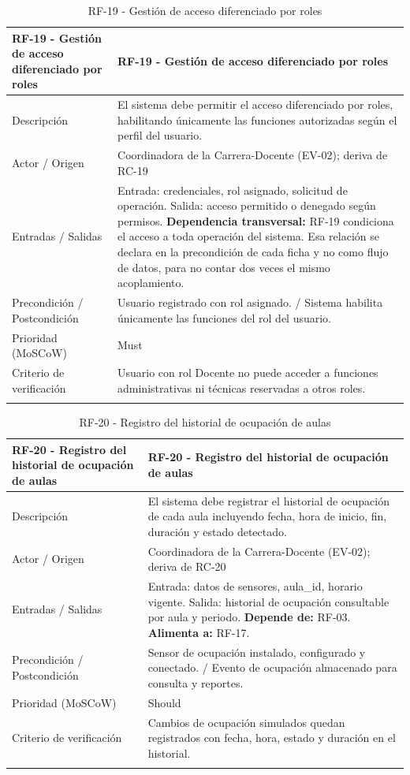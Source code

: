 \begingroup
\small
\begin{longtable}{|P{0.5000}|P{0.5000}|}
\hline
RF-19 - Gestión de acceso diferenciado por roles & RF-19 - Gestión de acceso diferenciado por roles \\ \hline
Descripción & El sistema debe permitir el acceso diferenciado por roles, habilitando únicamente las funciones autorizadas según el perfil del usuario. \\ \hline
Actor / Origen & Coordinadora de la Carrera-Docente (EV-02); deriva de RC-19 \\ \hline
Entradas / Salidas & Entrada: credenciales, rol asignado, solicitud de operación. Salida: acceso permitido o denegado según permisos. \textbf{Dependencia transversal:} RF-19 condiciona el acceso a toda operaci\'on del sistema. Esa relaci\'on se declara en la precondici\'on de cada ficha y no como flujo de datos, para no contar dos veces el mismo acoplamiento. \\ \hline
Precondición / Postcondición & Usuario registrado con rol asignado. / Sistema habilita únicamente las funciones del rol del usuario. \\ \hline
Prioridad (MoSCoW) & Must \\ \hline
Criterio de verificación & Usuario con rol Docente no puede acceder a funciones administrativas ni técnicas reservadas a otros roles. \\ \hline
\caption{RF-19 - Gestión de acceso diferenciado por roles}
\end{longtable}
\endgroup

\begingroup
\small
\begin{longtable}{|P{0.5000}|P{0.5000}|}
\hline
RF-20 - Registro del historial de ocupación de aulas & RF-20 - Registro del historial de ocupación de aulas \\ \hline
Descripción & El sistema debe registrar el historial de ocupación de cada aula incluyendo fecha, hora de inicio, fin, duración y estado detectado. \\ \hline
Actor / Origen & Coordinadora de la Carrera-Docente (EV-02); deriva de RC-20 \\ \hline
Entradas / Salidas & Entrada: datos de sensores, aula\_id, horario vigente. Salida: historial de ocupación consultable por aula y periodo. \textbf{Depende de:} RF-03. \textbf{Alimenta a:} RF-17. \\ \hline
Precondición / Postcondición & Sensor de ocupación instalado, configurado y conectado. / Evento de ocupación almacenado para consulta y reportes. \\ \hline
Prioridad (MoSCoW) & Should \\ \hline
Criterio de verificación & Cambios de ocupación simulados quedan registrados con fecha, hora, estado y duración en el historial. \\ \hline
\caption{RF-20 - Registro del historial de ocupación de aulas}
\end{longtable}
\endgroup

